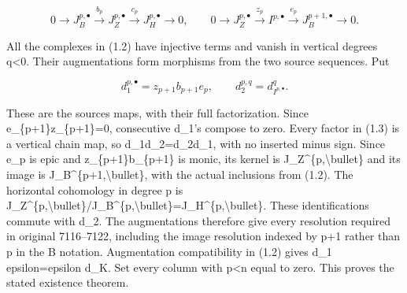 \documentclass[11pt]{article}
\begin{document}
\[
 0\to J_B^{p,\bullet}\xrightarrow{b_p}J_Z^{p,\bullet}
       \xrightarrow{c_p}J_H^{p,\bullet}\to0,\qquad
 0\to J_Z^{p,\bullet}\xrightarrow{z_p}I^{p,\bullet}
       \xrightarrow{e_p}J_B^{p+1,\bullet}\to0.                   \tag{1.2}
\]

All the complexes in (1.2)\allowbreak{} have injective terms and vanish in vertical degrees q\textless0. Their augmentations form morphisms from the two source sequences. Put

\[
 d_1^{p,\bullet}=z_{p+1}b_{p+1}e_p,\qquad
 d_2^{p,q}=d_{I^{p,\bullet}}^q.                                \tag{1.3}
\]

These are the source\textquotesingle s maps,\allowbreak{} with their full factorization. Since e\_\allowbreak{}\{p\allowbreak{}+1\}z\_\allowbreak{}\{p\allowbreak{}+1\}\allowbreak{}=0,\allowbreak{} consecutive d\_\allowbreak{}1's compose to zero. Every factor in (1.3)\allowbreak{} is a vertical chain map,\allowbreak{} so d\_\allowbreak{}1d\_\allowbreak{}2\allowbreak{}=d\_\allowbreak{}2d\_\allowbreak{}1,\allowbreak{} with no inserted minus sign. Since e\_\allowbreak{}p is epic and z\_\allowbreak{}\{p\allowbreak{}+1\}b\_\allowbreak{}\{p\allowbreak{}+1\} is monic,\allowbreak{} its kernel is J\_\allowbreak{}Z\textasciicircum{}\{p,\allowbreak{}\textbackslash{}bullet\} and its image is J\_\allowbreak{}B\textasciicircum{}\{p\allowbreak{}+1,\allowbreak{}\textbackslash{}bullet\},\allowbreak{} with the actual inclusions from (1.2)\allowbreak{}. The horizontal cohomology in degree p is J\_\allowbreak{}Z\textasciicircum{}\{p,\allowbreak{}\textbackslash{}bullet\}/\allowbreak{}J\_\allowbreak{}B\textasciicircum{}\{p,\allowbreak{}\textbackslash{}bullet\}\allowbreak{}=J\_\allowbreak{}H\textasciicircum{}\{p,\allowbreak{}\textbackslash{}bullet\}. These identifications commute with d\_\allowbreak{}2. The augmentations therefore give every resolution required in original 7116–\allowbreak{}7122,\allowbreak{} including the image resolution indexed by p\allowbreak{}+1 rather than p in the B notation. Augmentation compatibility in (1.2)\allowbreak{} gives d\_\allowbreak{}1 epsilon\allowbreak{}=epsilon d\_\allowbreak{}K. Set every column with p\textless n equal to zero. This proves the stated existence theorem.
\end{document}
